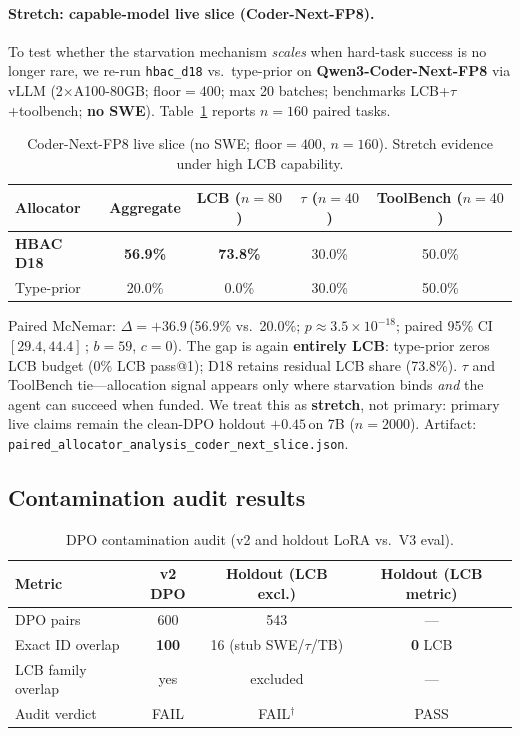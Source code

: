 \documentclass[11pt,letterpaper]{article}
\makeatletter
\newcommand{\passat}[1]{pass@#1}
\newcommand{\pp}{\,\text{pp}}
\makeatother
\begin{document}
\paragraph{Stretch: capable-model live slice (Coder-Next-FP8).}
\label{sec:cn-slice}
To test whether the starvation mechanism \emph{scales} when hard-task success is no longer rare, we re-run \texttt{hbac\_d18} vs.\ type-prior on \textbf{Qwen3-Coder-Next-FP8} via vLLM (2$\times$A100-80GB; floor${=}400$; max 20 batches; benchmarks LCB+$\tau$+toolbench; \textbf{no SWE}).
Table~\ref{tab:cn-slice} reports $n{=}160$ paired tasks.

\begin{table}[t]
\centering
\caption{Coder-Next-FP8 live slice (no SWE; floor${=}400$, $n{=}160$). Stretch evidence under high LCB capability.}
\label{tab:cn-slice}
\small
\begin{tabular}{lcccc}
\toprule
Allocator & Aggregate & LCB ($n{=}80$) & $\tau$ ($n{=}40$) & ToolBench ($n{=}40$) \\
\midrule
\textbf{HBAC D18} & \textbf{56.9\%} & \textbf{73.8\%} & 30.0\% & 50.0\% \\
Type-prior & 20.0\% & 0.0\% & 30.0\% & 50.0\% \\
\bottomrule
\end{tabular}
\end{table}

Paired McNemar: $\Delta{=}{+}36.9$\pp (56.9\% vs.\ 20.0\%; $p{\approx}3.5{\times}10^{-18}$; paired 95\% CI $[29.4,44.4]$\pp; $b{=}59$, $c{=}0$).
The gap is again \textbf{entirely LCB}: type-prior zeros LCB budget (0\% LCB \passat{1}); D18 retains residual LCB share (73.8\%).
$\tau$ and ToolBench tie---allocation signal appears only where starvation binds \emph{and} the agent can succeed when funded.
We treat this as \textbf{stretch}, not primary: primary live claims remain the clean-DPO holdout $+0.45$\pp on 7B ($n{=}2000$).
Artifact: \texttt{paired\_allocator\_analysis\_coder\_next\_slice.json}.

\subsection{Contamination audit results}
\label{sec:contamination-results}

\begin{table}[t]
\centering
\caption{DPO contamination audit (v2 and holdout LoRA vs.\ V3 eval).}
\label{tab:contamination}
\small
\begin{tabular}{lccc}
\toprule
Metric & v2 DPO & Holdout (LCB excl.) & Holdout (LCB metric) \\
\midrule
DPO pairs & 600 & 543 & --- \\
Exact ID overlap & \textbf{100} & 16 (stub SWE/$\tau$/TB) & \textbf{0} LCB \\
LCB family overlap & yes & excluded & --- \\
Audit verdict & FAIL & FAIL$^\dagger$ & PASS \\
\bottomrule
\end{tabular}
\end{table}
\end{document}
